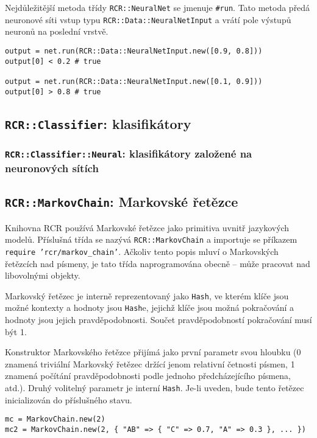 \documentclass[a4paper]{article}
\begin{document}
Nejdůležitější metoda třídy \texttt{RCR::NeuralNet} se jmenuje \texttt{\#run}.
Tato metoda předá neuronové síti vstup typu \texttt{RCR::Data::NeuralNetInput} a
vrátí pole výstupů neuronů na poslední vrstvě.
\begin{lstlisting}
output = net.run(RCR::Data::NeuralNetInput.new([0.9, 0.8]))
output[0] < 0.2 # true

output = net.run(RCR::Data::NeuralNetInput.new([0.1, 0.9]))
output[0] > 0.8 # true
\end{lstlisting}



\subsection{\texttt{RCR::Classifier}: klasifikátory}
\subsubsection{\texttt{RCR::Classifier::Neural}: klasifikátory založené na
neuronových sítích}

\subsection{\texttt{RCR::MarkovChain}: Markovské řetězce}
Knihovna RCR používá Markovské řetězce jako primitiva uvnitř jazykových modelů.
Příslušná třída se nazývá \texttt{RCR::MarkovChain} a importuje se příkazem
\texttt{require 'rcr/markov\_chain'}. Ačkoliv tento popis mluví o Markovských
řetězcích nad písmeny, je tato třída naprogramována obecně -- může pracovat nad
libovolnými objekty.

Markovský řetězec je interně reprezentovaný jako \texttt{Hash}, ve kterém klíče
jsou možné kontexty a hodnoty jsou \texttt{Hash}e, jejichž klíče jsou možná
pokračování a hodnoty jsou jejich pravděpodobnosti. Součet pravděpodobností
pokračování musí být 1.

Konstruktor Markovského řetězce přijímá jako první parametr svou hloubku (0
znamená triviální Markovský řetězec držící jenom relativní četnosti písmen, 1
znamená počítání pravděpodobnosti podle jednoho předcházejícího písmena, atd.).
Druhý volitelný parametr je interní \texttt{Hash}. Je-li uveden, bude tento
řetězec inicializován do příslušného stavu.
\begin{lstlisting}
mc = MarkovChain.new(2)
mc2 = MarkovChain.new(2, { "AB" => { "C" => 0.7, "A" => 0.3 }, ... })
\end{lstlisting}
\end{document}
